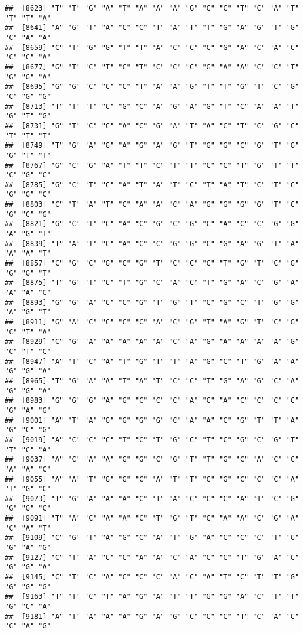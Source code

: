 \documentclass[
]{article}
\begin{document}
\begin{verbatim}
##  [8623] "T" "T" "G" "A" "T" "A" "A" "A" "G" "C" "C" "T" "C" "A" "T" "T" "T" "A"
##  [8641] "A" "G" "T" "A" "C" "C" "T" "A" "T" "T" "G" "A" "G" "T" "G" "C" "A" "A"
##  [8659] "C" "T" "G" "G" "T" "T" "A" "C" "C" "C" "G" "A" "C" "A" "C" "C" "C" "A"
##  [8677] "G" "T" "C" "T" "C" "T" "C" "C" "C" "G" "A" "A" "C" "C" "T" "G" "G" "A"
##  [8695] "G" "G" "C" "C" "C" "T" "A" "A" "G" "T" "T" "G" "T" "C" "G" "C" "G" "G"
##  [8713] "T" "T" "T" "C" "G" "C" "A" "G" "A" "G" "T" "C" "A" "A" "T" "G" "T" "G"
##  [8731] "G" "T" "C" "C" "A" "C" "G" "A" "T" "A" "C" "T" "C" "G" "C" "T" "T" "T"
##  [8749] "T" "G" "A" "G" "A" "G" "A" "G" "T" "G" "G" "C" "G" "T" "G" "G" "T" "T"
##  [8767] "G" "C" "G" "A" "T" "T" "C" "T" "T" "C" "C" "T" "G" "T" "T" "C" "G" "C"
##  [8785] "G" "C" "T" "C" "A" "T" "A" "T" "C" "T" "A" "T" "C" "T" "C" "G" "G" "C"
##  [8803] "C" "T" "A" "T" "C" "A" "A" "C" "A" "G" "G" "G" "G" "T" "C" "G" "C" "G"
##  [8821] "G" "C" "T" "C" "A" "C" "G" "C" "G" "C" "A" "C" "C" "G" "G" "A" "G" "T"
##  [8839] "T" "A" "T" "C" "A" "C" "C" "G" "G" "C" "G" "A" "G" "T" "A" "A" "A" "T"
##  [8857] "C" "G" "C" "G" "C" "G" "T" "C" "C" "C" "T" "G" "T" "C" "G" "G" "G" "T"
##  [8875] "T" "G" "T" "C" "T" "G" "C" "A" "C" "T" "G" "A" "C" "G" "A" "A" "A" "C"
##  [8893] "G" "G" "A" "C" "C" "G" "T" "G" "T" "C" "G" "C" "T" "G" "G" "A" "G" "T"
##  [8911] "G" "A" "C" "C" "C" "C" "A" "C" "G" "T" "A" "G" "T" "C" "G" "C" "T" "A"
##  [8929] "C" "G" "A" "A" "A" "A" "A" "C" "A" "G" "A" "A" "A" "A" "G" "C" "T" "C"
##  [8947] "A" "T" "C" "A" "T" "G" "T" "T" "A" "G" "C" "T" "G" "A" "A" "G" "G" "A"
##  [8965] "T" "G" "A" "A" "T" "A" "T" "C" "C" "T" "G" "A" "G" "C" "A" "G" "G" "A"
##  [8983] "G" "G" "G" "A" "G" "C" "C" "C" "A" "C" "A" "C" "C" "C" "C" "G" "A" "G"
##  [9001] "A" "T" "A" "G" "G" "G" "G" "C" "A" "A" "C" "G" "T" "T" "A" "G" "C" "G"
##  [9019] "A" "C" "C" "C" "T" "C" "T" "G" "C" "T" "C" "G" "C" "G" "T" "T" "C" "A"
##  [9037] "A" "C" "A" "A" "G" "G" "C" "G" "T" "T" "G" "C" "A" "C" "C" "A" "A" "C"
##  [9055] "A" "A" "T" "G" "G" "C" "A" "T" "T" "C" "G" "C" "C" "C" "A" "T" "G" "C"
##  [9073] "T" "G" "A" "A" "A" "C" "T" "A" "C" "C" "C" "A" "T" "C" "G" "G" "G" "C"
##  [9091] "T" "A" "C" "A" "A" "C" "T" "G" "T" "C" "A" "A" "C" "G" "A" "C" "A" "T"
##  [9109] "C" "G" "T" "A" "G" "C" "A" "T" "G" "A" "C" "C" "C" "T" "C" "G" "A" "G"
##  [9127] "C" "T" "A" "C" "C" "A" "A" "C" "A" "C" "C" "T" "G" "A" "C" "G" "G" "A"
##  [9145] "C" "T" "C" "A" "C" "C" "C" "A" "C" "A" "T" "C" "T" "T" "G" "G" "G" "G"
##  [9163] "T" "T" "C" "T" "A" "G" "A" "T" "T" "G" "G" "A" "C" "T" "T" "G" "C" "A"
##  [9181] "A" "T" "A" "A" "A" "G" "A" "G" "C" "C" "C" "T" "C" "A" "C" "C" "A" "G"

\end{verbatim}
\end{document}
